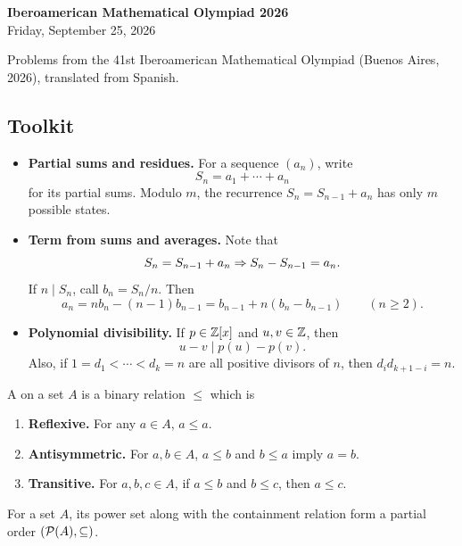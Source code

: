 \documentclass[12pt]{memoir}
\begin{document}
\begin{center}
    {\large\bfseries Iberoamerican Mathematical Olympiad 2026}\\[3pt]
    Friday, September 25, 2026
\end{center}

\noindent Problems from the 41st Iberoamerican Mathematical Olympiad
(Buenos Aires, 2026), translated from Spanish.

\subsection*{Toolkit}
\begin{itemize}[itemsep=4pt]
    \item \textbf{Partial sums and residues.}
    For a sequence \((a_n)\), write 
    \[S_n=a_1+\cdots+a_n\]
    for its partial sums. Modulo \(m\), the recurrence \(S_n=S_{n-1}+a_n\) has only \(m\)
    possible states.

    \item \textbf{Term from sums and averages.}
    Note that 
    \[
    S_n=S_{n-1}+a_n\Rightarrow S_n-S_{n-1}=a_n.
    \]
    If \(n\mid S_n\), call \(b_n=S_n/n\). Then
    \[
        a_n=nb_n-(n-1)b_{n-1}
        =b_{n-1}+n(b_n-b_{n-1})\qquad(n\geq2).
    \]

    \item \textbf{Polynomial divisibility.}
    If \(p\in\mathbb{Z}[x]\) and \(u,v\in\mathbb{Z}\), then
    \[
        u-v\mid p(u)-p(v).
    \]
    Also, if \(1=d_1<\cdots<d_k=n\) are all positive divisors of \(n\),
    then \(d_i d_{k+1-i}=n\).
\end{itemize}

\begin{nonum-Def}
A  on a set \(A\) is a binary relation \(\leq\) which is
\begin{enumerate}
    \item \textbf{Reflexive.} For any \(a\in A\), \(a\leq a\).
    \item \textbf{Antisymmetric.} For \(a,b\in A\), \(a\leq b\) and \(b\leq a\) imply \(a=b\).
    \item \textbf{Transitive.} For \(a,b,c\in A\), if \(a\leq b\) and \(b\leq c\), then \(a\leq c\).
\end{enumerate}
\end{nonum-Def}

\begin{nonum-Ex}
For a set \(A\), its power set along with the containment relation form a partial order \((\mathcal{P}(A),\subseteq)\).
\end{nonum-Ex}
\end{document}

